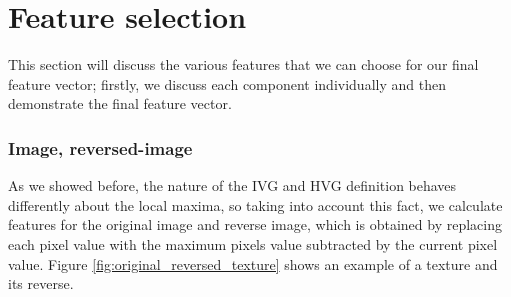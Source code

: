 \documentclass[conference]{IEEEtran}
\begin{document}
\section{\large{Feature selection}}
This section will discuss the various features that we can choose for our final feature vector; firstly, we discuss each component individually and then demonstrate the final feature vector.


\subsubsection{\textbf{Image, reversed-image}}
As we showed before, the nature of the IVG and HVG definition behaves differently about the local maxima, so taking into account this fact, we calculate features for the original image and reverse image, which is obtained by replacing each pixel value with the maximum pixels value subtracted by the current pixel value.
Figure \ref{fig:original_reversed_texture} shows an example of a texture and its reverse.
\end{document}
